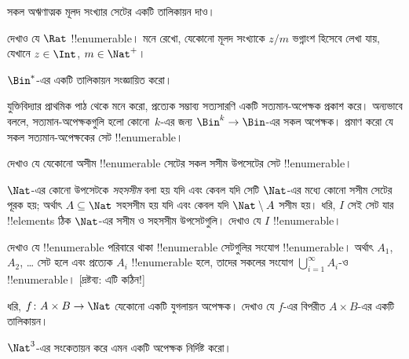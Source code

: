 \documentclass[../../../include/open-logic-section]{subfiles}
\begin{document}
\begin{prob}
সকল অঋণাত্মক মূলদ সংখ্যার সেটের একটি তালিকায়ন দাও।
\end{prob}

\begin{prob}
দেখাও যে $\Rat$ !!{enumerable}। মনে রেখো, যেকোনো মূলদ সংখ্যাকে $z/m$ ভগ্নাংশ হিসেবে লেখা যায়, যেখানে $z \in \Int$, $m \in \Nat^+$।
\end{prob}

\begin{prob}
$\Bin^*$-এর একটি তালিকায়ন সংজ্ঞায়িত করো।
\end{prob}

\begin{prob}
যুক্তিবিদ্যার প্রাথমিক পাঠ থেকে মনে করো, প্রত্যেক সম্ভাব্য সত্যসারণি একটি সত্যমান-অপেক্ষক প্রকাশ করে। অন্যভাবে বললে, সত্যমান-অপেক্ষকগুলি হলো কোনো~$k$-এর জন্য $\Bin^k \to \Bin$-এর সকল অপেক্ষক। প্রমাণ করো যে সকল সত্যমান-অপেক্ষকের সেট !!{enumerable}।
\end{prob}

\begin{prob}
দেখাও যে যেকোনো অসীম !!{enumerable} সেটের সকল সসীম উপসেটের সেট !!{enumerable}।
\end{prob}

\begin{prob}
$\Nat$-এর কোনো উপসেটকে \emph{সহসসীম} বলা হয় যদি এবং কেবল যদি সেটি $\Nat$-এর মধ্যে কোনো সসীম সেটের পূরক হয়; অর্থাৎ $A \subseteq \Nat$ সহসসীম হয় যদি এবং কেবল যদি $\Nat\setminus A$ সসীম হয়। ধরি, $I$ সেই সেট যার !!{element}s ঠিক $\Nat$-এর সসীম ও সহসসীম উপসেটগুলি। দেখাও যে $I$ !!{enumerable}। 
\end{prob}

\begin{prob}
দেখাও যে !!{enumerable} পরিবারে থাকা !!{enumerable} সেটগুলির সংযোগ !!{enumerable}। অর্থাৎ $A_1$, $A_2$, \dots{} সেট হলে এবং প্রত্যেক $A_i$ !!{enumerable} হলে, তাদের সকলের সংযোগ $\bigcup_{i=1}^\infty
A_i$-ও !!{enumerable}। [দ্রষ্টব্য: এটি কঠিন!]
\end{prob}

\begin{prob}
ধরি, $f \colon A \times B \to \Nat$ যেকোনো একটি যুগলায়ন অপেক্ষক। দেখাও যে $f$-এর বিপরীত $A \times B$-এর একটি তালিকায়ন।
\end{prob}

\begin{prob}
$\Nat^3$-এর সংকেতায়ন করে এমন একটি অপেক্ষক নির্দিষ্ট করো।
\end{prob}
\end{document}
